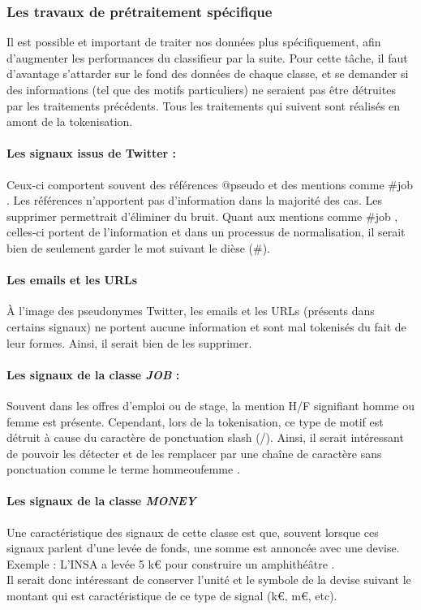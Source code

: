             \subsubsection{Les travaux de prétraitement spécifique}
                Il est possible et important de traiter nos données plus spécifiquement, afin d'augmenter les performances du classifieur par la suite. Pour cette tâche, il faut d'avantage s'attarder sur le fond des données de chaque classe, et se demander si des informations (tel que des motifs particuliers) ne seraient pas être détruites par les traitements précédents. Tous les traitements qui suivent sont réalisés en amont de la tokenisation.

                \paragraph{Les signaux issus de Twitter :}
                    Ceux-ci comportent souvent des références \og @pseudo \fg et des mentions comme \og \#job \fg. Les références n'apportent pas d'information dans la majorité des cas. Les supprimer permettrait d’éliminer du bruit. Quant aux mentions comme \og \#job \fg, celles-ci portent de l'information et dans un processus de normalisation, il serait bien de seulement garder le mot suivant le dièse (\#).

                \paragraph{Les emails et les URLs}
                    À l'image des pseudonymes Twitter, les emails et les URLs (présents dans certains signaux) ne portent aucune information et sont mal tokenisés du fait de leur formes. Ainsi, il serait bien de les supprimer.

                \paragraph{Les signaux de la classe \textit {JOB} :}
                    Souvent dans les offres d'emploi ou de stage, la mention \og H/F \fg signifiant \og homme ou femme \fg est présente. Cependant, lors de la tokenisation, ce type de motif est détruit à cause du caractère de ponctuation slash (/). Ainsi, il serait intéressant de pouvoir les détecter et de les remplacer par une chaîne de caractère sans ponctuation comme le terme \og hommeoufemme \fg.

                \paragraph{Les signaux de la classe \textit{MONEY}}
                    Une caractéristique des signaux de cette classe est que, souvent lorsque ces signaux parlent d'une levée de fonds, une somme est annoncée avec une devise. Exemple : \og L'INSA a levée 5 k€ pour construire un amphithéâtre \fg.\\
                    Il serait donc intéressant de conserver l'unité et le symbole de la devise suivant le montant qui est caractéristique de ce type de signal (k€, m€, etc).

